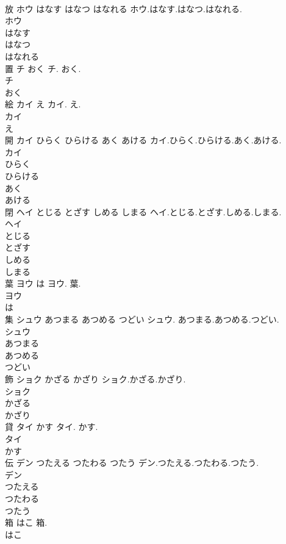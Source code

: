 \documentclass[8pt]{extreport}
\begin{document}
\begin{CJK}{UTF8}{min}
\\	放	ホウ はなす はなつ はなれる	ホウ.はなす.はなつ.はなれる.	
\\	ホウ
\\	はなす
\\	はなつ
\\	はなれる
\\	置	チ おく	チ. おく.	
\\	チ
\\	おく
\\	絵	カイ え	カイ. え.	
\\	カイ
\\	え
\\	開	カイ ひらく ひらける あく あける	カイ.ひらく.ひらける.あく.あける.	
\\	カイ
\\	ひらく
\\	ひらける
\\	あく
\\	あける
\\	閉	ヘイ とじる とざす しめる しまる	ヘイ.とじる.とざす.しめる.しまる.	
\\	ヘイ
\\	とじる
\\	とざす
\\	しめる
\\	しまる
\\	葉	ヨウ は	ヨウ. 葉.	
\\	ヨウ
\\	は
\\	集	シュウ あつまる あつめる つどい	シュウ. あつまる.あつめる.つどい.	
\\	シュウ
\\	あつまる
\\	あつめる
\\	つどい
\\	飾	ショク かざる かざり	ショク.かざる.かざり.	
\\	ショク
\\	かざる
\\	かざり
\\	貸	タイ かす	タイ. かす.	
\\	タイ
\\	かす
\\	伝	デン つたえる つたわる つたう	デン.つたえる.つたわる.つたう.	
\\	デン
\\	つたえる
\\	つたわる
\\	つたう
\\	箱	はこ	箱.	
\\	はこ

\end{CJK}
\end{document}
